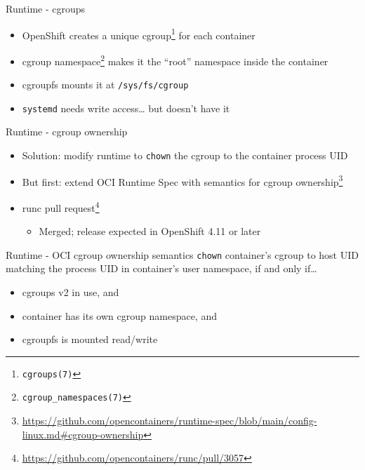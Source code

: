 \documentclass[ignorenonframetext,aspectratio=169,12pt]{beamer}
\begin{document}
\begin{frame}{Runtime - cgroups}
\protect\hypertarget{openshift-cgroup}{}
\begin{itemize}

\item OpenShift creates a unique cgroup\footnote{\tt cgroups(7)} for each container

\item cgroup namespace\footnote{\tt cgroup\_namespaces(7)} makes it the ``root''
      namespace inside the container

\item cgroupfs mounts it at {\tt /sys/fs/cgroup}

\item {\tt systemd} needs write access\ldots{} but doesn't have it

\end{itemize}
\end{frame}

\begin{frame}{Runtime - cgroup ownership}
\protect\hypertarget{openshift-cgroup-ownership}{}
\begin{itemize}

\item Solution: modify runtime to {\tt chown} the cgroup to the container
      process UID

\item But first: extend OCI Runtime Spec with semantics for
      cgroup ownership\footnote{\url{https://github.com/opencontainers/runtime-spec/blob/main/config-linux.md\#cgroup-ownership}}

\item runc pull request\footnote{\url{https://github.com/opencontainers/runc/pull/3057}}
  \begin{itemize}
  \item Merged; release expected in OpenShift 4.11 or later
  \end{itemize}

\end{itemize}
\end{frame}

\begin{frame}{Runtime - OCI cgroup ownership semantics}
\protect\hypertarget{openshift-cgroup-ownership-semantics}{}
{\tt chown} container's cgroup to host UID matching the process UID in
container's user namespace, if and only if\ldots{}
\begin{itemize}
\item cgroups v2 in use, and
\item container has its own cgroup namespace, and
\item cgroupfs is mounted read/write
\end{itemize}
\end{frame}
\end{document}
